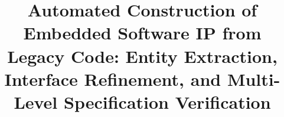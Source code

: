 \documentclass[manuscript, screen, review]{acmart}
\newcommand{\delete}[1]{}
\begin{document}
\title{Automated Construction of Embedded Software IP from Legacy Code: Entity Extraction, Interface Refinement, and Multi-Level Specification Verification}

\delete{
\author{Ben Trovato}
\authornote{Both authors contributed equally to this research.}
\email{trovato@corporation.com}
\orcid{1234-5678-9012}
\author{G.K.M. Tobin}
\correspondingauthor
\authornotemark[1]
\email{webmaster@marysville-ohio.com}
\affiliation{%
  \institution{Institute for Clarity in Documentation}
  \city{Dublin}
  \state{Ohio}
  \country{USA}
}

\author{Lars Th{\o}rv{\"a}ld}
\affiliation{%
  \institution{The Th{\o}rv{\"a}ld Group}
  \city{Hekla}
  \country{Iceland}}
\email{larst@affiliation.org}

\author{Valerie B\'eranger}
\affiliation{%
  \institution{Inria Paris-Rocquencourt}
  \city{Rocquencourt}
  \country{France}
}

\author{Aparna Patel}
\affiliation{%
 \institution{Rajiv Gandhi University}
 \city{Doimukh}
 \state{Arunachal Pradesh}
 \country{India}}

\author{Huifen Chan}
\affiliation{%
  \institution{Tsinghua University}
  \city{Haidian Qu}
  \state{Beijing Shi}
  \country{China}}

\author{Charles Palmer}
\affiliation{%
  \institution{Palmer Research Laboratories}
  \city{San Antonio}
  \state{Texas}
  \country{USA}}
\email{cpalmer@prl.com}

\author{John Smith}
\affiliation{%
  \institution{The Th{\o}rv{\"a}ld Group}
  \city{Hekla}
  \country{Iceland}}
\email{jsmith@affiliation.org}

\author{Julius P. Kumquat}
\correspondingauthor
\affiliation{%
  \institution{The Kumquat Consortium}
  \city{New York}
  \country{USA}}
\email{jpkumquat@consortium.net}


\renewcommand{\shortauthors}{Trovato et al.}
}
\begin{abstract}
   
\end{abstract}
\end{document}
